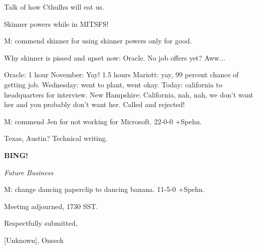 \documentclass[12pt]{article}
\newcommand{\bing}{{\bf BING!} }
\newcommand{\goto}[1]{\bing \vskip 12pt \centerline{{\em{#1}}}}
\begin{document}
Talk of how Cthulhu will eat us.

Skinner powers while in MITSFS!

M: commend skinner for using skinner powers only for good.

Why skinner is pissed and upset now: Oracle. No job offers yet? Aww...

Oracle: 1 hour November: Yay! 1.5 hours Mariott: yay, 99 percent chance of getting job. Wednesday: went to plant, went okay. Today: california to headquarters for interview. New Hampshire: California, nah, nah, we don't want her and you probably don't want her. Called and rejected!

M: commend Jen for not working for Microsoft. 22-0-0 +Spehn.

Texas, Austin? Technical writing.

\goto{Future Business}

M: change dancing paperclip to dancing banana. 11-5-0 +Spehn.

\vspace{12pt}

\noindent
Meeting adjourned, 1730 SST.

\vspace{18pt}

\centerline{Respectfully submitted,}
\centerline{[Unknown], Onseck}
\end{document}
